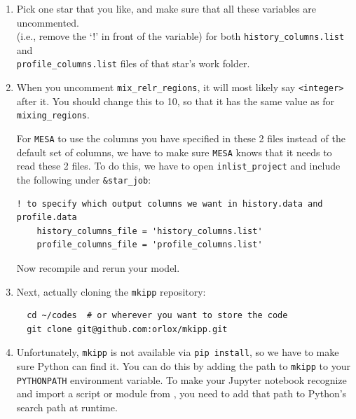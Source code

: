 \documentclass[11pt,a4paper]{article}
\begin{document}

\begin{enumerate}

  \item Pick one star that you like, and make sure that all these variables are uncommented. \\
   (i.e., remove the `!' in front of the variable) for both \texttt{history\_columns.list} and \\ 
   \texttt{profile\_columns.list} files of that star's work folder.
  \item 
When you uncomment \texttt{mix\_relr\_regions}, it will most likely say \texttt{<integer>} after it. You should change this to 10, so that it has the same value as for \texttt{mixing\_regions}.


For \texttt{MESA} to use the columns you have specified in these 2 files instead of the default set of columns, we have to make sure \texttt{MESA} knows that it needs to read these 2 files. To do this, we have to open \texttt{inlist\_project} and include the following under \texttt{\&star\_job}:
\begin{lstlisting}
! to specify which output columns we want in history.data and profile.data
    history_columns_file = 'history_columns.list'
    profile_columns_file = 'profile_columns.list'
\end{lstlisting}

Now recompile and rerun your model.



  \item Next, actually cloning the \texttt{mkipp} repository:

\begin{lstlisting}
  cd ~/codes  # or wherever you want to store the code
  git clone git@github.com:orlox/mkipp.git
\end{lstlisting}


  \item Unfortunately, \texttt{mkipp} is not available via \texttt{pip install}, so we have to make sure Python can find it. 
  You can do this by adding the path to \texttt{mkipp} to your \texttt{PYTHONPATH} environment variable. 
  To make your Jupyter notebook recognize and import a script or module from , you need to add that path to Python’s search path at runtime.


\end{enumerate}
\end{document}
